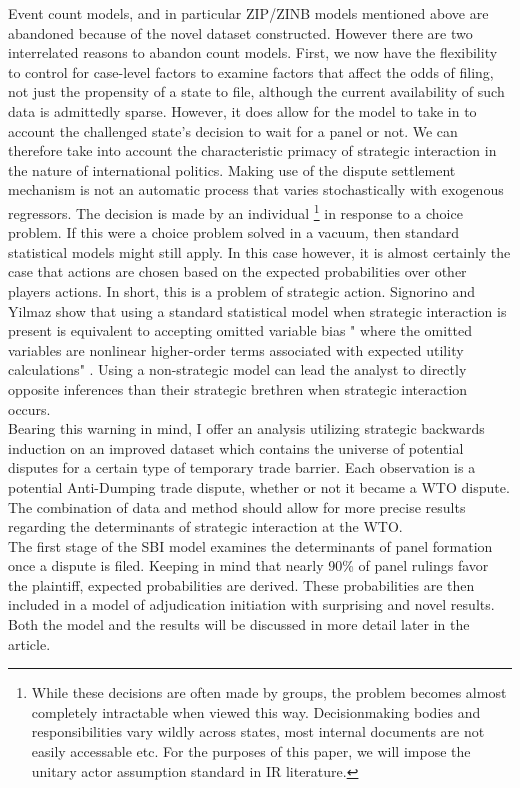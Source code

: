 \documentclass[]{article}
\begin{document}
Event count models, and in particular ZIP/ZINB models mentioned above are abandoned because of the novel dataset constructed. However there are two interrelated reasons to abandon count models. First, we now have the flexibility to control for case-level factors to examine factors that affect the odds of filing, not just the propensity of a state to file, although the current availability of such data is admittedly sparse. However, it does allow for the model to take in to account the challenged state's decision to wait for a panel or not. We can therefore take into account the characteristic primacy of strategic interaction in the nature of international politics. Making use of the dispute settlement mechanism is not an automatic process that varies stochastically with exogenous regressors. The decision is made by an individual \footnote{While these decisions are often made by groups, the problem becomes almost completely intractable when viewed this way. Decisionmaking bodies and responsibilities vary wildly across states, most internal documents are not easily accessable etc. For the purposes of this paper, we will impose the unitary actor assumption standard in IR literature.}  in response to a choice problem. If this were a choice problem solved in a vacuum, then standard statistical models might still apply. In this case however, it is almost certainly the case that actions are chosen based on the expected probabilities over other players actions. In short, this is a problem of strategic action. Signorino and Yilmaz show that using a standard statistical model when strategic interaction is present is equivalent to accepting omitted variable bias " where the omitted variables are nonlinear higher-order terms associated with expected utility calculations" \cite{SY2003}. Using a non-strategic model can lead the analyst to directly opposite inferences than their strategic brethren when strategic interaction occurs. \\

Bearing this warning in mind, I offer an analysis utilizing strategic backwards induction on an improved dataset which contains the universe of potential disputes for a certain type of temporary trade barrier. Each observation is a potential Anti-Dumping trade dispute, whether or not it became a WTO dispute. The combination of data and method should allow for more precise results regarding the determinants of strategic interaction at the WTO. \\

 The first stage of the SBI model examines the determinants of panel formation once a dispute is filed. Keeping in mind that nearly 90\% of panel rulings favor the plaintiff, expected probabilities are derived. These probabilities are then included in a model of adjudication initiation with surprising and novel results. Both the model and the results will be discussed in more detail later in the article. 
\end{document}
